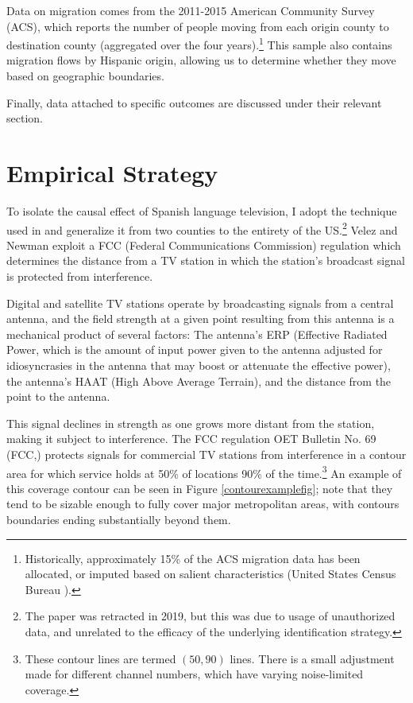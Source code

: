 \documentclass[11pt]{article}
\begin{document}
Data on migration comes from the 2011-2015 American Community Survey (ACS), which reports the number of people moving from each origin county to destination county (aggregated over the four years).\footnote{ Historically, approximately 15\% of the ACS migration data has been allocated, or imputed based on salient characteristics (United States Census Bureau \cite{noauthor_american_2020}). } This sample also contains migration flows by Hispanic origin, allowing us to determine whether they move based on geographic boundaries.

Finally, data attached to specific outcomes are discussed under their relevant section.


\section{Empirical Strategy}\label{secrd}

To isolate the causal effect of Spanish language television, I adopt the technique used in \cite{velez_tuning_2019}  and generalize it from two counties to the entirety of the US.\footnote{ The paper was retracted in 2019, but this was due to usage of unauthorized data, and unrelated to the efficacy of the underlying identification strategy.} Velez and Newman exploit a FCC (Federal Communications Commission) regulation which determines the distance from a TV station in which the station's broadcast signal is protected from interference.

Digital and satellite TV stations operate by broadcasting signals from a central antenna, and the field strength at a given point resulting from this antenna is a mechanical product of several factors: The antenna's ERP (Effective Radiated Power, which is the amount of input power given to the antenna adjusted for idiosyncrasies in the antenna that may boost or attenuate the effective power), the antenna's HAAT (High Above Average Terrain), and the distance from the point to the antenna.


This signal declines in strength as one grows more distant from the station, making it subject to interference. The FCC regulation OET Bulletin No. 69 (FCC,\cite{noauthor_oet_2004}) protects signals for commercial TV stations from interference in a contour area for which service holds at 50\% of locations 90\% of the time.\footnote{ These contour lines are termed $(50,90)$ lines. There is a small adjustment made for different channel numbers, which have varying noise-limited coverage. } An example of this coverage contour can be seen in Figure \ref{contourexamplefig}; note that they tend to be sizable enough to fully cover major metropolitan areas, with contours boundaries ending substantially beyond them.
\end{document}
